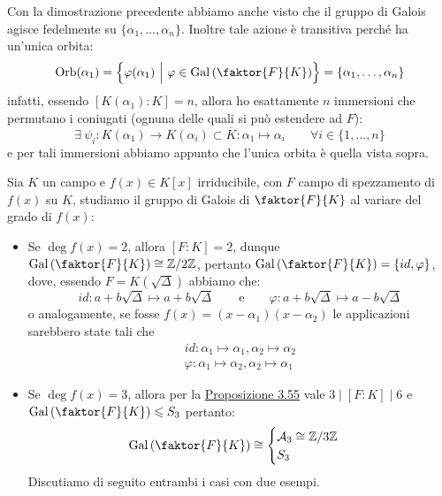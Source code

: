 \documentclass[11pt]{scrartcl}
\begin{document}
\begin{remark}
Con la dimostrazione precedente abbiamo anche visto che il gruppo di Galois agisce fedelmente su $\{\alpha_1,\ldots,\alpha_n\}$. Inoltre tale azione è transitiva perché ha un'unica orbita:
\[ \Orb(\alpha_1) = \left\{\varphi(\alpha_1) ~\Big|~ \varphi \in \Gal\left(\faktor{F}{K}\right)\right\} = \{\alpha_1,\ldots,\alpha_n\}
    \]
infatti, essendo $[K(\alpha_1) : K] = n$, allora ho esattamente $n$ immersioni che permutano i coniugati (ognuna delle quali si può estendere ad $F$):
\[ \exists~ \psi_i : K(\alpha_1) \longrightarrow K(\alpha_i) \subset \overline K : \alpha_1 \longmapsto \alpha_i \qquad \forall i \in \{1,\ldots,n\}
    \]
e per tali immersioni abbiamo appunto che l'unica orbita è quella vista sopra.
\end{remark}

\begin{example}
    Sia $K$ un campo e $f(x) \in K[x]$ irriducibile, con $F$ campo di spezzamento di $f(x)$ su $K$, studiamo il gruppo di Galois di $\faktor{F}{K}$ al variare del grado di $f(x)$:
    \begin{itemize}
        \item Se $\deg f(x) = 2$, allora $[F : K] = 2$, dunque $\Gal\left(\faktor{F}{K}\right) \cong \Z{2}$, pertanto $\Gal\left(\faktor{F}{K}\right) = \{id,\varphi\}$, dove, essendo $F = K(\sqrt{\Delta})$ abbiamo che:
        \[ id : a+b\sqrt{\Delta} \longmapsto a+b\sqrt{\Delta} \qquad \text{e} \qquad \varphi : a+b\sqrt{\Delta} \longmapsto a-b\sqrt{\Delta}
            \]
        o analogamente, se fosse $f(x) = (x - \alpha_1)(x - \alpha_2 )$ le applicazioni sarebbero state tali che 
	\begin{align*}
            id : \alpha_1 \longmapsto \alpha_1, \alpha_2 \longmapsto \alpha_2 \\
            \varphi : \alpha_1 \longmapsto \alpha_2, \alpha_2 \longmapsto \alpha_1
        \end{align*}
        \item Se $\deg f(x) = 3$, allora per la \hyperref[3.55]{Proposizione 3.55} vale
	$3 \mid [F : K] \mid 6$ e $\Gal\left(\faktor{F}{K}\right) \leqslant S_3$ pertanto:
        \[ \Gal\left(\faktor{F}{K}\right) \cong \begin{cases}
            \mathcal{A}_3 \cong \Z{3} \\
            S_3
        \end{cases}
            \]
        Discutiamo di seguito entrambi i casi con due esempi.
    \end{itemize}
\end{example}
\end{document}
